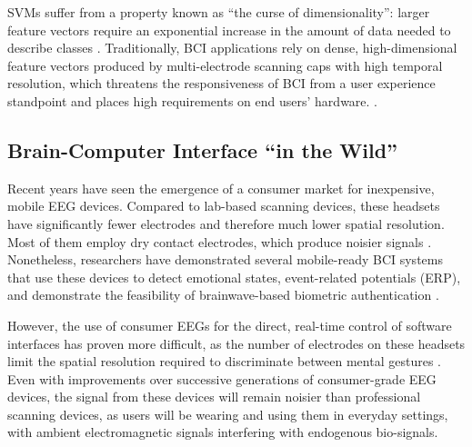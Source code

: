 SVMs suffer from a property known as ``the curse of dimensionality'': larger feature vectors require an exponential increase in the amount of data needed to describe classes \cite{jain_statistical_2000}. Traditionally, BCI applications rely on dense, high-dimensional feature vectors produced by multi-electrode scanning caps with high temporal resolution, which threatens the responsiveness of BCI from a user experience standpoint and places high requirements on end users' hardware. \cite{lotte_review_2007}. 

\subsection{Brain-Computer Interface ``in the Wild''}

\noindent Recent years have seen the emergence of a consumer market for inexpensive, mobile EEG devices. Compared to lab-based scanning devices, these headsets have significantly fewer electrodes and therefore much lower spatial resolution. Most of them employ dry contact electrodes, which produce noisier signals \cite{de2014mobile}. Nonetheless, researchers have demonstrated several mobile-ready BCI systems that use these devices to detect emotional states, event-related potentials (ERP), and demonstrate the feasibility of brainwave-based biometric authentication \cite{crowley_evaluating_2010,grierson_better_2011,adams_i_2013}. 


However, the use of consumer EEGs for the direct, real-time control of software interfaces has proven more difficult, as the number of electrodes on these headsets limit the spatial resolution required to discriminate between mental gestures \cite{carrino_self-paced_2012,larsen_classification_2011}. Even with improvements over successive generations of consumer-grade EEG devices, the signal from these devices will remain noisier than professional scanning devices, as users will be wearing and using them in everyday settings, with ambient electromagnetic signals interfering with endogenous bio-signals.


